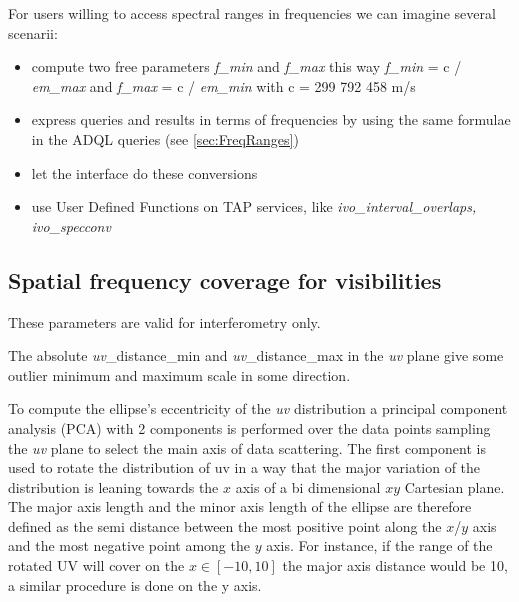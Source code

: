 \documentclass[11pt,a4paper]{ivoa}
\begin{document}
For users willing to access spectral ranges in frequencies we can imagine several scenarii:
\begin{itemize}
	\item compute two free parameters \emph{f\_min} and \emph{f\_max} this way \emph{f\_min} = c / \emph{em\_max} and \emph{f\_max} = c / \emph{em\_min} with c = 299 792 458 m/s
	\item express queries and results in terms of frequencies by using the same  formulae in the ADQL queries (see \ref{sec:FreqRanges})
	\item let the interface do these conversions 
	\item use User Defined Functions on TAP services, like  \emph{ivo\_interval\_overlaps, ivo\_specconv}	
\end{itemize}


\subsection{Spatial frequency coverage for visibilities  }
These parameters are valid for interferometry only.

The absolute \emph{uv}\_distance\_min and \emph{uv}\_distance\_max  in the \emph{uv} plane give some outlier minimum and maximum scale in some direction.

To compute the ellipse's eccentricity of the \emph{uv} distribution a principal component analysis
(PCA) with 2 components is performed over the data points sampling the \emph{uv} plane to select the
main axis of data scattering. 
The first component is used to rotate the distribution of uv in a way that the major variation
of the distribution is leaning towards the $x$ axis of a bi dimensional $xy$ Cartesian plane.
The major axis length and the minor axis length of the ellipse are therefore defined as the
semi distance between the most positive point along the $x$/$y$ axis and the most negative point
among the $y$ axis. For instance, if the range of the rotated UV will cover on the $x \in [-10,
10]$ the major axis distance would be 10, a similar procedure is done on the y axis.
\end{document}

